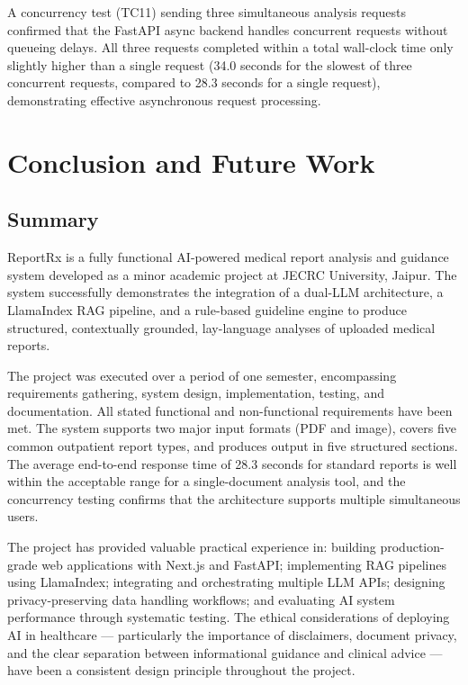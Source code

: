 \documentclass[12pt,a4paper]{report}
\begin{document}
A concurrency test (TC11) sending three simultaneous analysis requests confirmed that the FastAPI async backend handles concurrent requests without queueing delays. All three requests completed within a total wall-clock time only slightly higher than a single request (34.0 seconds for the slowest of three concurrent requests, compared to 28.3 seconds for a single request), demonstrating effective asynchronous request processing.

\chapter{Conclusion and Future Work}

\section{Summary}
ReportRx is a fully functional AI-powered medical report analysis and guidance system developed as a minor academic project at JECRC University, Jaipur. The system successfully demonstrates the integration of a dual-LLM architecture, a LlamaIndex RAG pipeline, and a rule-based guideline engine to produce structured, contextually grounded, lay-language analyses of uploaded medical reports.

The project was executed over a period of one semester, encompassing requirements gathering, system design, implementation, testing, and documentation. All stated functional and non-functional requirements have been met. The system supports two major input formats (PDF and image), covers five common outpatient report types, and produces output in five structured sections. The average end-to-end response time of 28.3 seconds for standard reports is well within the acceptable range for a single-document analysis tool, and the concurrency testing confirms that the architecture supports multiple simultaneous users.

The project has provided valuable practical experience in: building production-grade web applications with Next.js and FastAPI; implementing RAG pipelines using LlamaIndex; integrating and orchestrating multiple LLM APIs; designing privacy-preserving data handling workflows; and evaluating AI system performance through systematic testing. The ethical considerations of deploying AI in healthcare --- particularly the importance of disclaimers, document privacy, and the clear separation between informational guidance and clinical advice --- have been a consistent design principle throughout the project.
\end{document}
